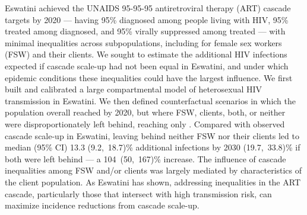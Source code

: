 Eswatini achieved the UNAIDS 95-95-95 antiretroviral therapy (ART) cascade targets by 2020
--- having
95\% diagnosed among people living with HIV,
95\% treated among diagnosed, and
95\% virally suppressed among treated
---
with minimal inequalities across subpopulations,
including for female sex workers (FSW) and their clients.
We sought to estimate the additional HIV infections expected
if cascade scale-up had not been equal in Eswatini,
and under which epidemic conditions these inequalities could have the largest influence.
We first built and calibrated
a large compartmental model of heterosexual HIV transmission in Eswatini.
We then defined counterfactual scenarios in which
the population overall reached \casmd by 2020,
but where FSW, clients, both, or neither
were disproportionately left behind, reaching only \caslo.
Compared with observed cascade scale-up in Eswatini,
leaving behind neither FSW nor their clients led to median (95\% CI)
13.3 (9.2,~18.7)\% additional infections by 2030  (19.7,~33.8)\% if both were left behind
--- a 104~(50,~167)\% increase.
The influence of cascade inequalities among FSW and/or clients
was largely mediated by characteristics of the client population.
As Eswatini has shown, addressing inequalities in the ART cascade,
particularly those that intersect with high transmission risk,
can maximize incidence reductions from cascade scale-up.
